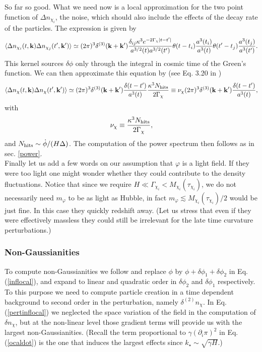 \documentclass[11pt,amsmath,floats,floatfix,nofootinbib,secnumarabic, superscriptaddress, tightenlines]{revtex4}
\newcommand{\beq}{\begin{equation}}
\newcommand{\eeq}{\end{equation}}
\newcommand{\be}{\begin{equation}}
\newcommand{\ee}{\end{equation}}
\begin{document}
{So far so good. What we need now is a local approximation for the two point function of $\Delta n_{\chi_i}$, the noise, which should also include the effects of the decay rate of the particles. The expression is given by~\cite{trapped}
\be\langle\Delta n_{\chi_i}(t,{\bf k})\Delta n_{\chi_j}(t',{\bf k}')\rangle\simeq(2\pi)^3\delta^{(3)}({\bf k}+{\bf k}')\frac{\delta_{ij}\kappa^3 e^{-2\Gamma_\chi|t-t'|}}{a^{3/2}(t) a^{3/2}(t')}\theta(t-t_i)\frac{a^3(t_i)}{a^3(t)}\theta(t'-t_j)\frac{a^3(t_j)}{a^3(t')}.\ee
This kernel sources $\delta\phi$ only through the integral in cosmic time of the Green's function. We can then approximate this equation by (see Eq. 3.20 in \cite{trapped})
\be  \langle\Delta n_\chi(t,{\bf k})\Delta n_\chi(t',{\bf k}')\rangle\simeq  (2\pi)^3\delta^{(3)}({\bf k}+{\bf k}')\frac{\delta(t-t')}{a^{3}(t)}\frac{\kappa^3 N_{\rm hits}}{2\Gamma_\chi}\equiv \nu_{\chi}(2\pi)^3\delta^{(3)}({\bf k}+{\bf k}')\frac{\delta(t-t')}{a^{3}(t)},
\ee
with
\beq
\label{nunhits}
\nu_{\chi} \equiv \frac{\kappa^3 N_{\rm hits}}{2\Gamma_\chi},
\eeq
and $N_{\rm hits}\sim\dot{\phi}/(H\Delta)$. The computation of the power spectrum then follows as in sec. \ref{power}.\\

Finally let us add a few words on our assumption that $\varphi$ is a light field. If they were too light one might wonder whether they could contribute
to the density fluctuations. Notice that  since we require $H \ll \Gamma_{\chi_i} < M_{\chi_i}(\tau_{\chi_i})$,
we do not necessarily need $m_\varphi$ to be as light as Hubble, in fact $m_\varphi \lesssim M_{\chi_i}(\tau_{\chi_i})/2$ would be just fine. In this case they quickly  redshift away. (Let us stress that even if they were effectively massless they could still be irrelevant for the late time curvature perturbations.)

\subsubsection{Non-Gaussianities}

To compute non-Gaussianities we follow \cite{trapped} and replace $\phi$ by $\phi+\delta\phi_1+\delta\phi_2$ in Eq. (\ref{inflocal}), and expand to linear and quadratic order in $\delta\phi_2$ and $\delta\phi_1$ respectively. To this purpose we need to compute particle creation in a time dependent background to second order in the perturbation, namely $\delta^{(2)} n_\chi$. In Eq. (\ref{pertinflocal}) we neglected the space variation of the field in the computation of $\delta n_\chi$, but at the non-linear level those gradient terms will provide us with the largest non-Gaussianities. (Recall the term proportional to $\gamma (\partial_i \pi)^2$ in Eq. (\ref{ocaldot}) is the one that induces the largest effects since $k_\star \sim \sqrt{\gamma H}$.)

}
\end{document}
